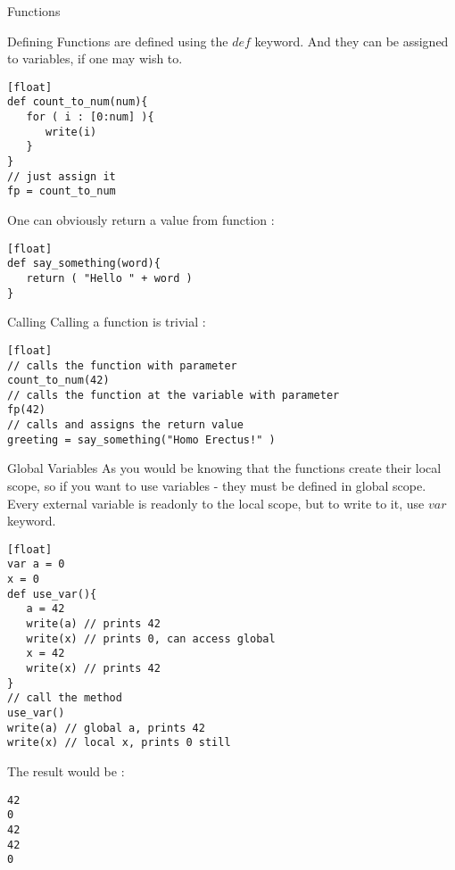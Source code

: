 \begin{section}{Functions}

\begin{subsection}{Defining}
Functions are defined using the $def$ keyword.
And they can be assigned to variables, if one may wish to.
\begin{lstlisting}[style=JexlStyle][float]
def count_to_num(num){
   for ( i : [0:num] ){
      write(i)
   }
}
// just assign it 
fp = count_to_num
\end{lstlisting}

One can obviously return a value from function :

\begin{lstlisting}[style=JexlStyle][float]
def say_something(word){
   return ( "Hello " + word ) 
}
\end{lstlisting}
\end{subsection}

\begin{subsection}{Calling}
Calling a function is trivial :

\begin{lstlisting}[style=JexlStyle][float]
// calls the function with parameter
count_to_num(42) 
// calls the function at the variable with parameter
fp(42) 
// calls and assigns the return value 
greeting = say_something("Homo Erectus!" ) 
\end{lstlisting}

\end{subsection}

\begin{subsection}{Global Variables}
As you would be knowing that the functions create their local scope, 
so if you want to use variables - they must be defined in global scope.
Every external variable is readonly to the local scope, but to write to it, use $var$ keyword.  

\begin{lstlisting}[style=JexlStyle][float]
var a = 0
x = 0 
def use_var(){
   a = 42 
   write(a) // prints 42 
   write(x) // prints 0, can access global 
   x = 42 
   write(x) // prints 42 
}
// call the method
use_var()
write(a) // global a, prints 42 
write(x) // local x, prints 0 still
\end{lstlisting}
The result would be :
\begin{lstlisting}
42
0
42
42
0
\end{lstlisting}
\end{subsection}

\end{section}

